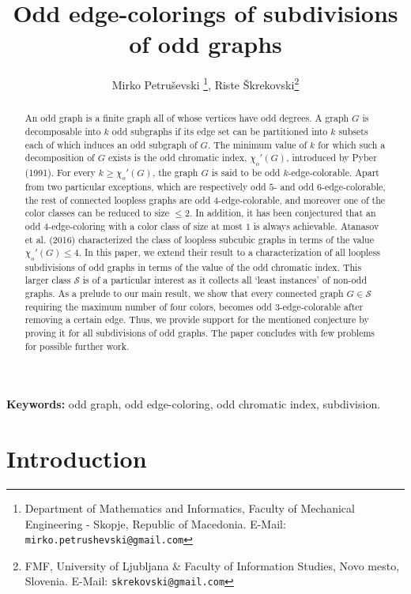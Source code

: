 \documentclass[a4paper,12pt]{article}
\title{Odd edge-colorings of subdivisions of odd graphs}
\author
{
	Mirko Petru\v{s}evski \thanks{Department of Mathematics and Informatics, Faculty of Mechanical Engineering - Skopje, Republic of Macedonia. E-Mail: \texttt{mirko.petrushevski@gmail.com}},
	\quad
	Riste \v{S}krekovski\thanks{FMF, University of Ljubljana \& Faculty of Information Studies, Novo mesto, Slovenia. E-Mail: \texttt{skrekovski@gmail.com}}
}
\numberwithin{equation}{section}
\begin{document}
\maketitle

\begin{abstract}
An odd graph is a finite graph all of whose vertices have odd degrees. A graph $G$ is decomposable into $k$ odd subgraphs if its edge set can be partitioned into $k$ subsets each of which induces an odd subgraph of $G$. The minimum value of $k$ for which such a decomposition of $G$ exists is the odd chromatic index, $\chi_{o}'(G)$, introduced by Pyber (1991). For every $k\geq\chi_{o}'(G)$, the graph $G$ is said to be odd $k$-edge-colorable. Apart from two particular exceptions, which are respectively odd $5$- and odd $6$-edge-colorable, the rest of connected loopless graphs are odd $4$-edge-colorable, and moreover one of the color classes can be reduced to size $\leq2$. In addition, it has been conjectured that an odd $4$-edge-coloring with a color class of size at most $1$ is always achievable. Atanasov et al. (2016) characterized the class of loopless subcubic graphs in terms of the value $\chi_{o}'(G)\leq4$. In this paper, we extend their result to a characterization of all loopless subdivisions of odd graphs in terms of the value of the odd chromatic index. This larger class $\mathcal{S}$ is of a particular interest as it collects all `least instances' of non-odd graphs.  As a prelude to our main result, we show that every connected graph $G\in \mathcal{S}$ requiring the maximum number of four colors, becomes odd $3$-edge-colorable after removing a certain edge. Thus, we provide support for the mentioned conjecture by proving it for all subdivisions of odd graphs. The paper concludes with few problems for possible further work.
\end{abstract}

\medskip

\noindent \textbf{Keywords:} odd graph, odd edge-coloring, odd chromatic index, subdivision.


\section{Introduction}
\end{document}
